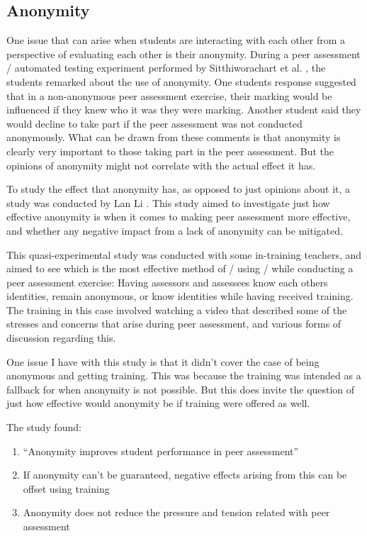 \documentclass[a4paper,11pt]{report}
\begin{document}
\subsection{Anonymity}
One issue that can arise when students are interacting with each other from a perspective of evaluating each other is their anonymity. During a peer assessment / automated testing experiment performed by Sitthiworachart et al. \cite{sitthiworachart_effective_2004}, the students remarked about the use of anonymity. One students response suggested that in a non-anonymous peer assessment exercise, their marking would be influenced if they knew who it was they were marking. Another student said they would decline to take part if the peer assessment was not conducted anonymously. What can be drawn from these comments is that anonymity is clearly very important to those taking part in the peer assessment. But the opinions of anonymity might not correlate with the actual effect it has.\par

To study the effect that anonymity has, as opposed to just opinions about it, a study was conducted by Lan Li \cite{li_role_2016}. This study aimed to investigate just how effective anonymity is when it comes to making peer assessment more effective, and whether any negative impact from a lack of anonymity can be mitigated.\par
This quasi-experimental study was conducted with some in-training teachers, and aimed to see which is the most effective method of / using / while conducting a peer assessment exercise: Having assessors and assessees know each others identities, remain anonymous, or know identities while having received training. The training in this case involved watching a video that described some of the stresses and concerns that arise during peer assessment, and various forms of discussion regarding this.\par
One issue I have with this study is that it didn't cover the case of being anonymous and getting training. This was because the training was intended as a fallback for when anonymity is not possible. But this does invite the question of just how effective would anonymity be if training were offered as well.\par
The study found:
\begin{enumerate}
 \item ``Anonymity improves student performance in peer assessment''
 \item If anonymity can't be guaranteed, negative effects arising from this can be offset using training
 \item Anonymity does not reduce the pressure and tension related with peer assessment
\end{enumerate} 
\end{document}
